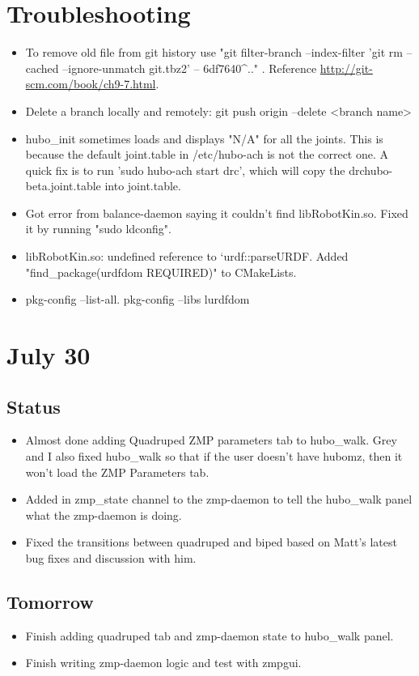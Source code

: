\documentclass[letterpaper, 10 pt]{report}
\begin{document}
\section*{Troubleshooting}
\begin{itemize}
\item To remove old file from git history use "git filter-branch --index-filter 'git rm --cached --ignore-unmatch git.tbz2' -- 6df7640\string^.." . Reference \url{http://git-scm.com/book/ch9-7.html}.
\item Delete a branch locally and remotely: git push origin --delete <branch name>
\item hubo\_init sometimes loads and displays "N/A" for all the joints. This is because the default joint.table in /etc/hubo-ach is not the correct one. A quick fix is to run 'sudo hubo-ach start drc', which will copy the drchubo-beta.joint.table into joint.table.
\item Got error from balance-daemon saying it couldn't find libRobotKin.so. Fixed it by running "sudo ldconfig".
\item libRobotKin.so: undefined reference to `urdf::parseURDF. Added "find\_package(urdfdom REQUIRED)" to CMakeLists.
\item pkg-config --list-all. pkg-config --libs lurdfdom
\end{itemize}

\section*{July 30}
\subsection*{Status}
\begin{itemize}
\item Almost done adding Quadruped ZMP parameters tab to hubo\_walk. Grey and I also fixed hubo\_walk so that if the user doesn't have hubomz, then it won't load the ZMP Parameters tab.
\item Added in zmp\_state channel to the zmp-daemon to tell the hubo\_walk panel what the zmp-daemon is doing.
\item Fixed the transitions between quadruped and biped based on Matt's latest bug fixes and discussion with him.
\end{itemize}
\subsection*{Tomorrow}
\begin{itemize}
\item Finish adding quadruped tab and zmp-daemon state to hubo\_walk panel.
\item Finish writing zmp-daemon logic and test with zmpgui.
\end{itemize}
\end{document}
